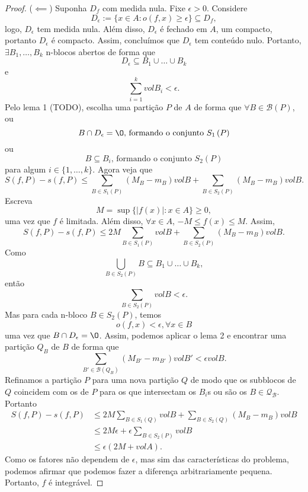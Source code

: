 \begin{proof}
    ($\impliedby$) Suponha $D_f$ com medida nula. Fixe $\epsilon>0$. Considere \[
	D_\epsilon := \{x\in A : o\left( f,x \right) \ge \epsilon\} \subseteq D_f
    ,\] logo, $D_\epsilon$ tem medida nula. Além disso, $D_\epsilon$ é fechado em $A$, um compacto, portanto $D_\epsilon$ é compacto. Assim, concluímos que $D_\epsilon$ tem conteúdo nulo. Portanto, $\exists B_1,\ldots,B_k$ n-blocos abertos de forma que \[
	D_\epsilon \subseteq B_1\cup \ldots\cup B_k
    \] e \[
	\sum_{i=1}^{k} vol B_i < \epsilon
    .\] Pelo lema 1 (TODO), escolha uma partição $P$ de $A$ de forma que $\forall B\in \mathcal{B}\left( P \right) $, ou \[
    B\cap D_\epsilon = \O \text{, formando o conjunto $S_1\left( P \right) $}
    \] ou \[
    B \subseteq B_i\text{, formando o conjunto $S_2\left( P \right) $}
    \] para algum $i\in \{1,\ldots,k\}$. Agora veja que \[
    S\left( f, P \right) - s\left( f,P \right) \le \sum_{B\in S_1\left( P \right)	 } \left( M_B - m_B \right) vol B + \sum_{B\in S_2\left( P \right)	 } \left( M_B - m_B \right) vol B
    .\] Escreva \[
    M = \sup \{\left| f\left( x \right)  \right| : x\in A\} \ge 0
    ,\] uma vez que $f$ é limitada. Além disso, $\forall x\in A$, $-M \le f\left( x \right) \le M$. Assim, \[
    S\left( f, P \right) - s\left( f,P \right) \le 2M \sum_{B\in S_1\left( P \right)	 } vol B+ \sum_{B\in S_2\left( P \right)	 } \left( M_B - m_B \right) vol B
    .\] Como \[
    \bigcup_{B\in S_2\left( P \right) } B \subseteq B_1\cup \ldots\cup B_k
    ,\] então \[
    \sum_{B\in S_2\left( P \right) } vol B < \epsilon
    .\] Mas para cada n-bloco $B\in S_2\left( P \right) $, temos \[
    o\left( f, x \right) < \epsilon, \forall x\in B
    \] uma vez que $B\cap D_\epsilon = \O$. Assim, podemos aplicar o lema 2 e encontrar uma partição $Q_B$ de $B$ de forma que \[
    \sum_{B'\in \mathcal{B}\left( Q_B \right) } \left( M_{B'} - m_{B'} \right) vol B' < \epsilon vol B
    .\] Refinamos a partição $P$ para uma nova partição $Q$ de modo que os subblocos de $Q$ coincidem com os de $P$ para os que intersectam os $B_i$s ou são os $B\in \mathcal{Q_B}$. Portanto
    \begin{align*}
	S\left( f, P \right) - s\left( f,P \right) &\le 2M \sum_{B\in S_1\left( Q \right)	 } vol B+ \sum_{B\in S_2\left( Q \right)	 } \left( M_B - m_B \right) vol B \\
						   &\le  2M\epsilon + \epsilon \sum_{B\in S_2\left( P \right) } vol B \\
						   &\le \epsilon \left( 2M + vol A \right) 
    .\end{align*}
    Como os fatores não dependem de $\epsilon$, mas sim das características do problema, podemos afirmar que podemos fazer a diferença arbitrariamente pequena. Portanto, $f$ é integrável.


\end{proof}
